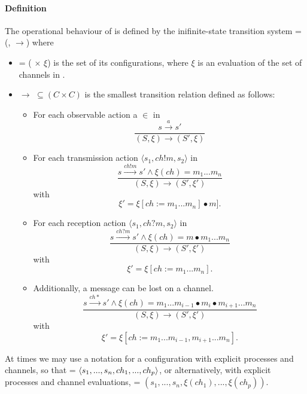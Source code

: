 \paragraph{Definition}
\label{CTS}
The operational behaviour of  is defined by the inifinite-state transition system  = (, $\rightarrow$) where
\begin{itemize}
\item[]
    = ( $\times$ $\xi$) is the set of its configurations, where $\xi$ is an evaluation of the set of channels  in .
\item[]
  $\rightarrow$ $\subseteq (C \times C)$  is the smallest transition relation defined as follows:
  \begin{itemize}
    \item
      For each observable action a $\in$  in  
      \[
      \dfrac{s \xrightarrow{a} s'}{(S, \xi) \rightarrow (S', \xi)}
      \]
    \item
      For each transmission action $\langle s_1, ch!m, s_2 \rangle$ in 
      \[
      \dfrac{s \xrightarrow{ch!m} s' \wedge \xi(ch) = m_1...m_n}{(S, \xi) \rightarrow (S', \xi')} \] with \[ \xi' = \xi[ch := m_1...m_n] \bullet m].
      \]
    \item
      For each reception action $\langle s_1, ch?m, s_2 \rangle$ in 
      \[
      \dfrac{s \xrightarrow{ch?m} s' \wedge \xi(ch) = m \bullet m_1...m_n}{(S, \xi) \rightarrow (S', \xi')} \] with \[ \xi' = \xi[ch:= m_1...m_n].
      \]
    \item
      Additionally, a message can be lost on a channel.
      \[
      \dfrac{s \xrightarrow{ch*} s' \wedge \xi(ch) = m_1...m_{i-1} \bullet m_i \bullet m_{i+1}...m_n}{(S, \xi) \rightarrow (S', \xi')} \] with \[ \xi' = \xi[ch:= m_1...m_{i-1},m_{i+1}...m_n].
      \]

  \end{itemize}
\end{itemize}

At times we may use a notation for a configuration  with explicit processes and channels, so that  = $\langle s_1,...,s_n, ch_1,...,ch_p\rangle$, or alternatively, with explicit processes and channel evaluations,  = $(s_1,...,s_n, \xi(ch_1),...,\xi(ch_p))$.

